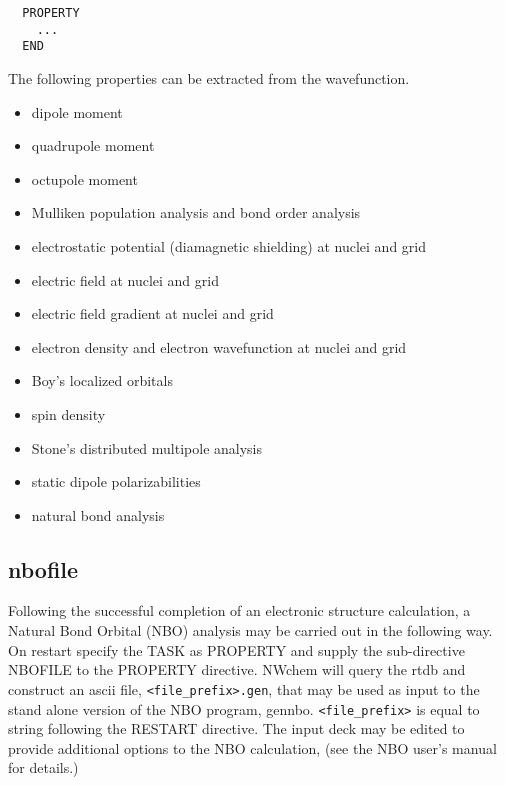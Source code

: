 \label{sec:property}
\begin{verbatim}
  PROPERTY
    ...
  END
\end{verbatim}

The following properties can be extracted from the wavefunction.

\begin{itemize}
\item dipole moment
\item quadrupole moment
\item octupole moment
\item Mulliken population analysis and bond order analysis
\item electrostatic potential (diamagnetic shielding) at nuclei and grid
\item electric field at nuclei and grid
\item electric field gradient at nuclei and grid
\item electron density and electron wavefunction at nuclei and grid
\item Boy's localized orbitals
\item spin density
\item Stone's distributed multipole analysis
\item static dipole polarizabilities
\item natural bond analysis
\end{itemize}

\subsection{nbofile}

Following the successful completion of an electronic structure
calculation, a Natural Bond Orbital (NBO) analysis may be carried out
in the following way.  On restart specify the TASK as PROPERTY and
supply the sub-directive NBOFILE to the PROPERTY directive.  NWchem
will query the rtdb and construct an ascii file,
\verb+<file_prefix>.gen+, that may be used as input to the stand alone
version of the NBO program, gennbo.  \verb+<file_prefix>+ is equal to
string following the RESTART directive.  The input deck may be edited
to provide additional options to the NBO calculation, (see the NBO
user's manual for details.)

